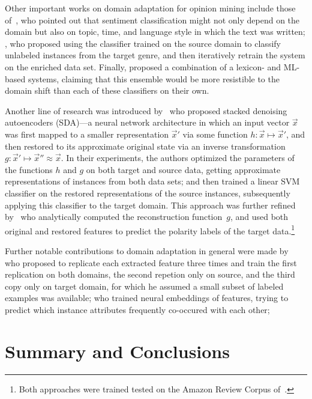 Other important works on domain adaptation for opinion mining include
those of~\citet{Read:05}, who pointed out that sentiment
classification might not only depend on the domain but also on topic,
time, and language style in which the text was written;
\citet{Tan:07}, who proposed using the classifier trained on the
source domain to classify unlabeled instances from the target genre,
and then iteratively retrain the system on the enriched data set.
Finally, \citet{Andreevskaia:08} proposed a combination of a lexicon-
and ML-based systems, claiming that this ensemble would be more
resistible to the domain shift than each of these classifiers on their
own.

Another line of research was introduced by~\citet{Glorot:11} who
proposed stacked denoising autoencoders (SDA)---a neural network
architecture in which an input vector $\vec{x}$ was first mapped to a
smaller representation $\vec{x}'$ via some function
$h: \vec{x}\mapsto\vec{x}'$, and then restored to its approximate
original state via an inverse transformation
$g: \vec{x}'\mapsto\vec{x}''\approx\vec{x}$.  In their experiments,
the authors optimized the parameters of the functions $h$ and $g$ on
both target and source data, getting approximate representations of
instances from both data sets; and then trained a linear SVM
classifier on the restored representations of the source instances,
subsequently applying this classifier to the target domain.  This
approach was further refined by~\citet{Chen:12} who analytically
computed the reconstruction function~$g$, and used both original and
restored features to predict the polarity labels of the target
data.\footnote{Both approaches were trained tested on the Amazon
  Review Corpus of~\citet{Blitzer:07}.}


Further notable contributions to domain adaptation in general were
made by~\citet{Daume:07} who proposed to replicate each extracted
feature three times and train the first replication on both domains,
the second repetion only on source, and the third copy only on target
domain, for which he assumed a small subset of labeled examples was
available; \citet{Yang:15} who trained neural embeddings of features,
trying to predict which instance attributes frequently co-occured with
each other;

\section{Summary and Conclusions}\label{slsa:subsec:conclusions}

